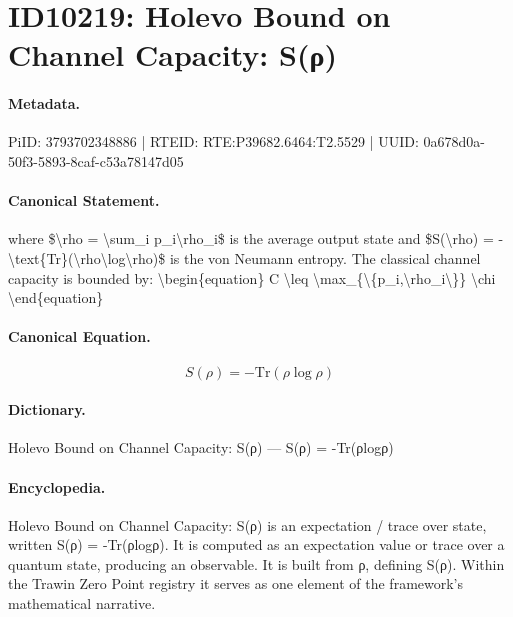 \section*{ID10219: Holevo Bound on Channel Capacity: S(ρ)}
\paragraph{Metadata.}
PiID: 3793702348886 | RTEID: RTE:P39682.6464:T2.5529 | UUID: 0a678d0a-50f3-5893-8caf-c53a78147d05

\paragraph{Canonical Statement.}
where \$\textbackslash{}rho = \textbackslash{}sum\_i p\_i\textbackslash{}rho\_i\$ is the average output state and \$S(\textbackslash{}rho) = -\textbackslash{}text\{Tr\}(\textbackslash{}rho\textbackslash{}log\textbackslash{}rho)\$ is the von Neumann entropy. The classical channel capacity is bounded by: \textbackslash{}begin\{equation\} C \textbackslash{}leq \textbackslash{}max\_\{\textbackslash{}\{p\_i,\textbackslash{}rho\_i\textbackslash{}\}\} \textbackslash{}chi \textbackslash{}end\{equation\}

\paragraph{Canonical Equation.}
\[
S(\rho) = -\text{Tr}(\rho\log\rho)
\]

\paragraph{Dictionary.}
Holevo Bound on Channel Capacity: S(ρ) — S(ρ) = -Tr(ρlogρ)

\paragraph{Encyclopedia.}
Holevo Bound on Channel Capacity: S(ρ) is an expectation / trace over state, written S(ρ) = -Tr(ρlogρ). It is computed as an expectation value or trace over a quantum state, producing an observable. It is built from ρ, defining S(ρ). Within the Trawin Zero Point registry it serves as one element of the framework's mathematical narrative.

